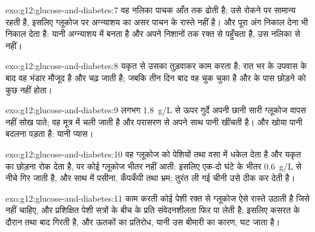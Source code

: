 \begin{solution}{exo:g12:glucose-and-diabetes:7}
वह नलिका पाचक  आँत तक ढोती है; उसे रोकने पर  सामान्य रहती
है, इसलिए ग्लूकोज पर अग्न्याशय का असर पाचन के रास्ते नहीं है। और पूरा अंग
निकाल देना  भी निकाल देता है: यानी  अग्न्याशय में बनता है
और अपने निशानों तक रक्त से पहुँचता है, उस नलिका से नहीं।
\end{solution}

\begin{solution}{exo:g12:glucose-and-diabetes:8}
 यकृत से उसका  तुड़वाकर काम करता है; रात भर के उपवास के
बाद वह भंडार मौजूद है और  चढ़ जाती है; जबकि तीन दिन बाद वह
 चुक चुका है और  के पास छोड़ने को कुछ नहीं होता।
\end{solution}

\begin{solution}{exo:g12:glucose-and-diabetes:9}
लगभग \qty{1.8}{g/L} से ऊपर गुर्दे अपनी छानी सारी ग्लूकोज वापस नहीं सोख
पाते; वह मूत्र में चली जाती है और परासरण से अपने साथ पानी खींचती है। और खोया
पानी बदलना पड़ता है: यानी प्यास।
\end{solution}

\begin{solution}{exo:g12:glucose-and-diabetes:10}
वह  ग्लूकोज को पेशियों तथा वसा  में धकेल देता है और यकृत का
छोड़ना रोक देता है, पर कोई ग्लूकोज भीतर नहीं आती: इसलिए  एक-दो
घंटे के भीतर \qty{0.6}{g/L} से नीचे गिर जाती है, और साथ में पसीना, कँपकँपी
तथा भ्रम; तुरंत ली गई चीनी उसे ठीक कर देती है।
\end{solution}

\begin{solution}{exo:g12:glucose-and-diabetes:11}
काम करती कोई पेशी रक्त से ग्लूकोज ऐसे रास्ते उठाती है जिसे  नहीं
चाहिए, और प्रशिक्षित पेशी सत्रों के बीच  के प्रति संवेदनशीलता फिर पा
लेती है; इसलिए कसरत के दौरान तथा बाद  गिरती है, और ऊतकों का
प्रतिरोध, यानी उस बीमारी का कारण, घट जाता है।
\end{solution}

